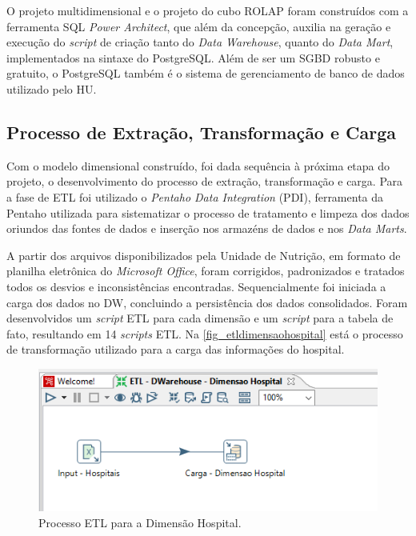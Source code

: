 O projeto multidimensional e o projeto do cubo ROLAP foram construídos com a ferramenta SQL \textit{Power Architect}, que além da concepção, auxilia na geração e execução do \textit{script} de criação tanto do \textit{Data Warehouse}, quanto do \textit{Data Mart}, implementados na sintaxe do PostgreSQL. Além de ser um SGBD robusto e gratuito, o PostgreSQL também é o sistema de gerenciamento de banco de dados utilizado pelo HU. 

\subsection{Processo de Extração, Transformação e Carga}
Com o modelo dimensional construído, foi dada sequência à próxima etapa do projeto, o desenvolvimento do processo de extração, transformação e carga. Para a fase de ETL foi utilizado o \textit{Pentaho Data Integration} (PDI), ferramenta da Pentaho utilizada para sistematizar o processo de tratamento e limpeza dos dados oriundos das fontes de dados e inserção nos armazéns de dados e nos \textit{Data Marts}.

A partir dos arquivos disponibilizados pela Unidade de Nutrição, em formato de planilha eletrônica do \textit{Microsoft Office}, foram corrigidos, padronizados e tratados todos os desvios e inconsistências encontradas. Sequencialmente foi iniciada a carga dos dados no DW, concluindo a persistência dos dados consolidados. Foram desenvolvidos um \textit{script} ETL para cada dimensão e um \textit{script} para a tabela de fato, resultando em 14 \textit{scripts} ETL. Na \autoref{fig_etldimensaohospital} está o processo de transformação utilizado para a carga das informações do hospital. 

\begin{figure}[htb]
	\caption{\label{fig_etldimensaohospital}Processo ETL para a Dimensão Hospital.}
	\begin{center}
	    \includegraphics[scale=0.8]{Imagens/figura - etl dw hospital.png}
	\end{center}
\end{figure}

